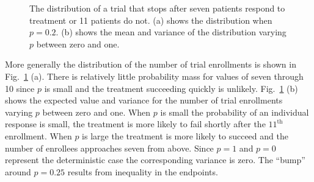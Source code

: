 \documentclass[review]{elsarticle}
\begin{document}
\begin{figure}[bp!]
\centering
{}
\hfill
{}
\caption{
The distribution of a trial that stops after seven patients respond to treatment
or 11 patients do not. (a) shows the distribution when
$p = 0.2$. (b) shows the mean and variance of the distribution varying $p$ 
between zero and one.
}
\label{fig:exp-and-var}
\end{figure}

More generally the distribution of the number of trial enrollments is shown in 
Fig.~\ref{fig:exp-and-var} (a). There is relatively little probability mass
for values of seven through 10 since $p$ is small and the treatment succeeding
quickly is unlikely.
Fig.~\ref{fig:exp-and-var} (b) shows the expected value and variance for the
number of trial enrollments varying $p$ between zero and one. When $p$ is
small the probability of an individual response is small, the treatment
is more likely to fail shortly after the $11^{\text{th}}$ enrollment.
When $p$ is large the treatment is more likely to succeed and the number of 
enrollees approaches seven from above. 
Since $p=1$ and $p=0$ represent the deterministic
case the corresponding variance is zero. The ``bump'' around $p=0.25$ results 
from inequality in the endpoints.
\end{document}
